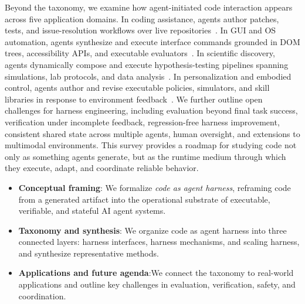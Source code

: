 Beyond the taxonomy, we examine how agent-initiated code interaction appears across five application domains. In coding assistance, agents author patches, tests, and issue-resolution workflows over live repositories~\cite{jimenez2023swe,yang2024swe,wang2024openhands}. In GUI and OS automation, agents synthesize and execute interface commands grounded in DOM trees, accessibility APIs, and executable evaluators~\cite{deng2023mind2webgeneralistagentweb,zhou2024webarenarealisticwebenvironment}. In scientific discovery, agents dynamically compose and execute hypothesis-testing pipelines spanning simulations, lab protocols, and data analysis~\cite{bran2023chemcrowaugmentinglargelanguagemodels,boiko2023autonomous,lu2024aiscientistfullyautomated,huang2025biomni}. In personalization and embodied control, agents author and revise executable policies, simulators, and skill libraries in response to environment feedback~\cite{ahn2022can,liang2023code,wang2023voyager}. We further outline open challenges for harness engineering, including evaluation beyond final task success, verification under incomplete feedback, regression-free harness improvement, consistent shared state across multiple agents, human oversight, and extensions to multimodal environments. This survey provides a roadmap for studying code not only as something agents generate, but as the runtime medium through which they execute, adapt, and coordinate reliable behavior.


\begin{tcolorbox}[agentcontrib]
\begin{itemize}
    \item \textbf{Conceptual framing}: We formalize
    \emph{code as agent harness}, reframing code from a generated
    artifact into the operational substrate of executable,
    verifiable, and stateful AI agent systems.

     \item \textbf{Taxonomy and synthesis}: We organize
   code as agent harness into three connected layers: harness
    interfaces, harness mechanisms, and scaling harness, and synthesize representative methods.

    \item \textbf{Applications and future agenda}:We connect the taxonomy
to real-world applications and outline key challenges in evaluation,
verification, safety, and coordination.
\end{itemize}
\end{tcolorbox}
